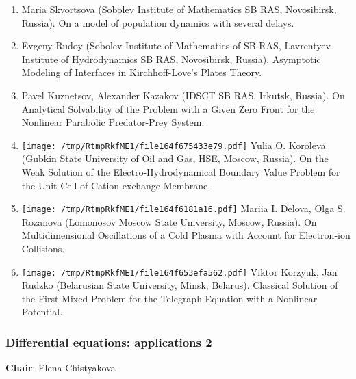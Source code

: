 \documentclass[
]{article}
\providecommand{\tightlist}{%
  \setlength{\itemsep}{0pt}\setlength{\parskip}{0pt}}
\begin{document}
\begin{enumerate}
\def\labelenumi{\arabic{enumi}.}
\tightlist
\item
  Maria Skvortsova (Sobolev Institute of Mathematics SB RAS,
  Novosibirsk, Russia). On a model of population dynamics with several
  delays.
\item
  Evgeny Rudoy (Sobolev Institute of Mathematics of SB RAS, Lavrentyev
  Institute of Hydrodynamics SB RAS, Novosibirsk, Russia). Asymptotic
  Modeling of Interfaces in Kirchhoff-Love's Plates Theory.
\item
  Pavel Kuznetsov, Alexander Kazakov (IDSCT SB RAS, Irkutsk, Russia). On
  Analytical Solvability of the Problem with a Given Zero Front for the
  Nonlinear Parabolic Predator-Prey System.
\item
  \protect\texttt{[image: /tmp/RtmpRkfME1/file164f675433e79.pdf]}
  Yulia O. Koroleva (Gubkin State University of Oil and Gas, HSE,
  Moscow, Russia). On the Weak Solution of the Electro-Hydrodynamical
  Boundary Value Problem for the Unit Cell of Cation-exchange Membrane.
\item
  \protect\texttt{[image: /tmp/RtmpRkfME1/file164f6181a16.pdf]}
  Mariia I. Delova, Olga S. Rozanova (Lomonosov Moscow State University,
  Moscow, Russia). On Multidimensional Oscillations of a Cold Plasma
  with Account for Electron-ion Collisions.
\item
  \protect\texttt{[image: /tmp/RtmpRkfME1/file164f653efa562.pdf]}
  Viktor Korzyuk, Jan Rudzko (Belarusian State University, Minsk,
  Belarus). Classical Solution of the First Mixed Problem for the
  Telegraph Equation with a Nonlinear Potential.
\end{enumerate}

\hypertarget{dea2}{%
\subsubsection{Differential equations: applications 2}\label{dea2}}

\textbf{Chair}: Elena Chistyakova
\end{document}
